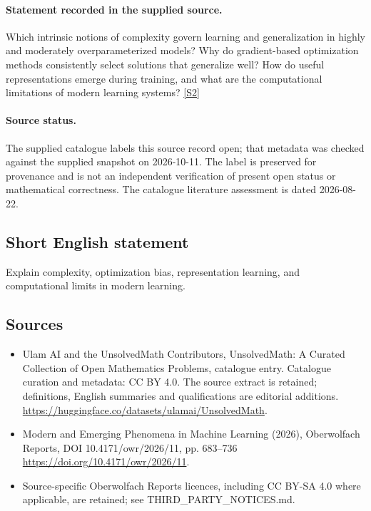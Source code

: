 \documentclass[11pt]{article}
\begin{document}
\paragraph{Statement recorded in the supplied source.}
Which intrinsic notions of complexity govern learning and generalization in highly and moderately overparameterized models? Why do gradient-based optimization methods consistently select solutions that generalize well? How do useful representations emerge during training, and what are the computational limitations of modern learning systems? \href{https://doi.org/10.4171/owr/2026/11}{[S2]}
\paragraph{Source status.}
The supplied catalogue labels this source record open; that metadata was checked against the supplied snapshot on 2026-10-11. The label is preserved for provenance and is not an independent verification of present open status or mathematical correctness. The catalogue literature assessment is dated 2026-08-22.
\subsection{Short English statement}
Explain complexity, optimization bias, representation learning, and computational limits in modern learning.
\subsection{Sources}
\begin{itemize}
\item[S1] Ulam AI and the UnsolvedMath Contributors, UnsolvedMath: A Curated Collection of Open Mathematics Problems, catalogue entry. Catalogue curation and metadata: CC BY 4.0. The source extract is retained; definitions, English summaries and qualifications are editorial additions.
\url{https://huggingface.co/datasets/ulamai/UnsolvedMath}.
\item[S2] Modern and Emerging Phenomena in Machine Learning (2026), Oberwolfach Reports, DOI 10.4171/owr/2026/11, pp. 683--736
\url{https://doi.org/10.4171/owr/2026/11}.
\item Source-specific Oberwolfach Reports licences, including CC BY-SA 4.0 where applicable, are retained; see THIRD\_PARTY\_NOTICES.md.
\end{itemize}
\end{document}
